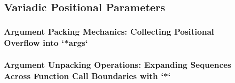 \subsection{Variadic Positional Parameters}
\subsubsection{Argument Packing Mechanics: Collecting Positional Overflow into `*args`}
\subsubsection{Argument Unpacking Operations: Expanding Sequences Across Function Call Boundaries with `*`}
